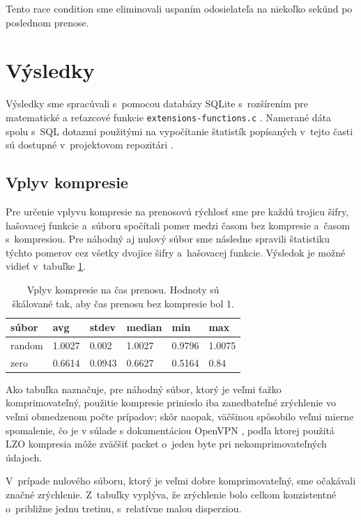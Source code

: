 \documentclass[12pt,a4paper]{article}
\begin{document}
Tento race condition sme eliminovali uspaním odosielateľa na niekoľko
sekúnd po poslednom prenose.

\section{Výsledky}

Výsledky sme spracúvali s~pomocou databázy SQLite \cite{sqlite} 
s~rozšírením pre matematické a reťazcové funkcie 
\texttt{extensions-functions.c} \cite{sqlite-contrib}. Namerané
dáta spolu s~SQL dotazmi použitými na vypočítanie štatistík popísaných
v~tejto časti sú dostupné v~projektovom repozitári \cite{proj}.

\subsection{Vplyv kompresie}

Pre určenie vplyvu kompresie na prenosovú rýchlosť sme pre každú trojicu
šifry, hašovacej funkcie a~súboru spočítali pomer medzi časom bez
kompresie a~časom s~kompresiou. Pre náhodný aj nulový súbor sme následne
spravili štatistiku týchto pomerov cez všetky dvojice šifry a~hašovacej
funkcie. Výsledok je možné vidieť v~tabuľke \ref{tbl:compression}.

\begin{table}\centering
    \caption{Vplyv kompresie na čas prenosu. Hodnoty sú škálované tak, aby
    čas prenosu bez kompresie bol 1.}
    \label{tbl:compression}
    \begin{tabular}{|l||l|l|l|l|l|}
        \hline
        \bf súbor & \bf  avg & \bf stdev & \bf median & \bf min & \bf max \\ \hline 
        random & 1.0027 & 0.002 & 1.0027 & 0.9796 & 1.0075 \\ \hline
        zero & 0.6614 & 0.0943 & 0.6627 & 0.5164 & 0.84\\ \hline
    \end{tabular}
\end{table}

Ako tabuľka naznačuje, pre náhodný súbor, ktorý je veľmi ťažko
komprimovateľný, použitie kompresie prinieslo iba zanedbateľné zrýchlenie
vo veľmi obmedzenom počte prípadov; skôr naopak, väčšinou spôsobilo veľmi
mierne spomalenie, čo je v súlade s dokumentáciou OpenVPN
\cite{openvpn-manual}, podľa ktorej použitá LZO kompresia môže zväčšiť
packet o~jeden byte pri nekomprimovateľných údajoch.

V~prípade nulového súboru, ktorý je veľmi dobre komprimovateľný, sme
očakávali značné zrýchlenie. Z~tabuľky vyplýva, že zrýchlenie bolo celkom
konzistentné o~približne jednu tretinu, s~relatívne malou disperziou.
\end{document}
